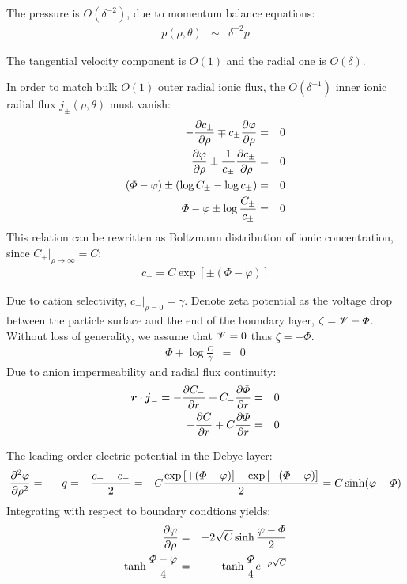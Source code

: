 The pressure is $O(\delta^{-2})$, due to momentum balance equations:
\begin{eqnarray}
 \nonumber p(\rho, \theta) &\sim& \delta^{-2} p
\end{eqnarray}

The tangential velocity component is $O(1)$ and the radial one is $O(\delta)$.

In order to match bulk $O(1)$ outer radial ionic flux, 
the $O(\delta^{-1})$ inner ionic radial flux $j_\pm(\rho, \theta)$ must vanish:
\begin{eqnarray}
 \nonumber -\frac{\partial c_\pm}{\partial \rho} \mp c_\pm \frac{\partial \varphi}{\partial \rho} &=& 0 \\
 \nonumber \frac{\partial \varphi}{\partial \rho} \pm\frac{1}{c_\pm}\frac{\partial c_\pm}{\partial \rho} &=& 0 \\
 \nonumber \left(\varPhi - \varphi\right) \pm\left(\log C_\pm - \log c_\pm\right) &=& 0 \\
 \nonumber \varPhi - \varphi \pm \log \frac{C_\pm}{c_\pm} &=& 0
\end{eqnarray}
This relation can be rewritten as Boltzmann distribution of ionic concentration,
since $C_\pm|_{\rho\rightarrow\infty} = C$:
\begin{eqnarray}
c_\pm = C \exp\left[\pm(\varPhi - \varphi)\right]
\end{eqnarray}

Due to cation selectivity, $c_+|_{\rho=0} = \gamma$.
Denote zeta potential as the voltage drop between the particle surface and the end of
the boundary layer, $\zeta = \mathscr{V} - \varPhi$. Without loss of generality, we assume that 
$\mathscr{V} = 0$ thus $\zeta = -\varPhi$.
\begin{eqnarray}
\varPhi + \log\frac{C}{\gamma}&=& 0
\end{eqnarray}
Due to anion impermeability and radial flux continuity:
\begin{eqnarray}
 \nonumber \boldsymbol{r} \cdot \boldsymbol{j}_- = -\frac{\partial C_-}{\partial r} + C_- \frac{\partial \varPhi}{\partial r} &=& 0 \\
-\frac{\partial C}{\partial r} + C \frac{\partial \varPhi}{\partial r} &=& 0
\end{eqnarray}

The leading-order electric potential in the Debye layer:
\begin{eqnarray}  \nonumber
\frac{\partial ^2 \varphi}{\partial \rho^2} &=& -q = -\frac{c_+ - c_-}{2} = 
-C\frac{\exp\left[+(\varPhi - \varphi)\right] - \exp\left[-(\varPhi - \varphi)\right]}{2} = 
C \sinh(\varphi - \varPhi)
\end{eqnarray}
Integrating with respect to boundary condtions yields:
\begin{eqnarray}  \nonumber
\frac{\partial \varphi}{\partial \rho} &=& -2\sqrt{C}\sinh\frac{\varphi - \varPhi}{2} \\  \nonumber
\tanh\frac{\varPhi - \varphi}{4} &=& \tanh\frac{\varPhi}{4} e^{-\rho \sqrt{C}}
\end{eqnarray}

